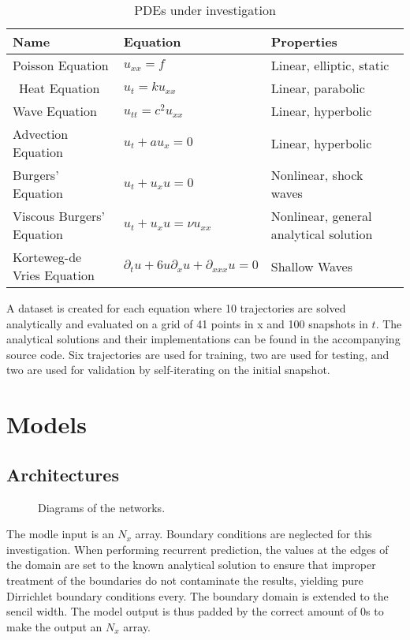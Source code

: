 \documentclass{article}
\begin{document}
\begin{table}
  \caption{\label{tab:pdes}PDEs under investigation}
  \begin{tabular}{lll}
    \hline
    Name & Equation & Properties\\
    \hline\hline
    Poisson Equation & $u_{xx} = f $ & Linear, elliptic, static \\\hline\
    Heat Equation & $u_{t} = k u_{xx} $ & Linear, parabolic \\\hline
    Wave Equation & $u_{tt} = c^2 u_{xx} $ & Linear, hyperbolic\\\hline
    Advection Equation & $u_{t} + a u_x = 0 $ & Linear, hyperbolic\\\hline
    Burgers' Equation & $u_{t} + u_x u = 0 $ & Nonlinear, shock waves \\\hline
    Viscous Burgers' Equation & $u_{t} + u_x u = \nu u_{xx} $ & Nonlinear, general analytical solution \\\hline
    Korteweg-de Vries Equation & $\partial_t u + 6 u \partial_x u + \partial_{xxx}u = 0$ & Shallow Waves \\\hline
  \end{tabular}
\end{table}

A dataset is created for each equation where 10 trajectories are solved analytically and evaluated on a grid of 41 points in x and 100 snapshots in $t$. The analytical solutions and their implementations can be found in the accompanying source code. Six trajectories are used for training, two are used for testing, and two are used for validation by self-iterating on the initial snapshot. 


\section{Models}

\subsection{Architectures}
\begin{figure}
  \centering
  \fbox{\rule[-.5cm]{0cm}{4cm} \rule[-.5cm]{4cm}{0cm}}
  \caption{Diagrams of the networks.}
\end{figure}


The modle input is an $N_x$ array. Boundary conditions are neglected for this investigation. When
performing recurrent prediction, the values at the edges of the domain are set to
the known analytical solution to ensure that improper treatment of the
boundaries do not contaminate the results, yielding pure Dirrichlet
boundary conditions every. The boundary domain is extended to the
sencil width. The model output is thus padded by the correct amount of 0s to make the output an $N_x$ array.
\end{document}
